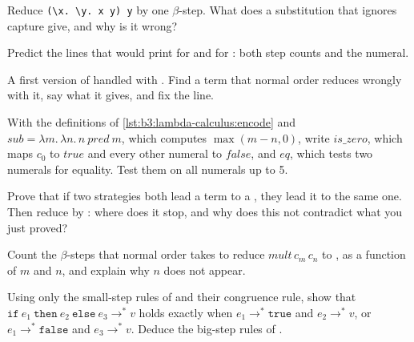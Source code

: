 \begin{exercise}[$\star$]\label{exo:b3:lambda-calculus:3}
Reduce \texttt{(\textbackslash{}x.\ \textbackslash{}y.\ x y) y} by one $\beta$-step. What does a substitution that ignores capture give, and why is it wrong?
\end{exercise}

\begin{exercise}[$\star$]\label{exo:b3:lambda-calculus:4}
Predict the lines that  would print for  and for : both step counts and the numeral.
\end{exercise}

\begin{exercise}[$\star\star$]\label{exo:b3:lambda-calculus:5}
A first version of  handled  with . Find a term that normal order reduces wrongly with it, say what it gives, and fix the line.
\end{exercise}

\begin{exercise}[$\star\star$]\label{exo:b3:lambda-calculus:6}
With the definitions of \cref{lst:b3:lambda-calculus:encode} and $\mathit{sub} = \lambda m.\,\lambda n.\,n\ \mathit{pred}\ m$, which computes $\max(m - n, 0)$, write $\mathit{is\_zero}$, which maps $c_0$ to $\mathit{true}$ and every other numeral to $\mathit{false}$, and $\mathit{eq}$, which tests two numerals for equality. Test them on all numerals up to 5.
\end{exercise}

\begin{exercise}[$\star\star$]\label{exo:b3:lambda-calculus:7}
Prove that if two strategies both lead a term to a , they lead it to the same one. Then reduce  by : where does it stop, and why does this not contradict what you just proved?
\end{exercise}

\begin{exercise}[$\star\star$]\label{exo:b3:lambda-calculus:8}
Count the $\beta$-steps that normal order takes to reduce $\mathit{mult}\,c_m\,c_n$ to , as a function of $m$ and $n$, and explain why $n$ does not appear.
\end{exercise}

\begin{exercise}[$\star\star$]\label{exo:b3:lambda-calculus:9}
Using only the small-step rules of  and their congruence rule, show that $\mathtt{if}\ e_1\ \mathtt{then}\ e_2\ \mathtt{else}\ e_3 \to^* v$ holds exactly when $e_1 \to^* \mathtt{true}$ and $e_2 \to^* v$, or $e_1 \to^* \mathtt{false}$ and $e_3 \to^* v$. Deduce the big-step rules of .
\end{exercise}

